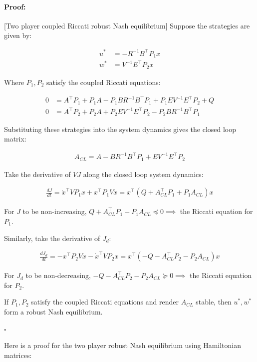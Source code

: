 \documentclass[3p]{elsarticle}
\newenvironment{proof}{\paragraph{Proof:}}{\hfill$\square$}
\begin{document}
\begin{proof}[Two player coupled Riccati robust Nash equilibrium]
Suppose the strategies are given by: 

\begin{align}
u^* &= -R^{-1}B^\top P_1 x \\
w^* &= V^{-1}E^\top P_2 x
\end{align}

Where $P_1, P_2$ satisfy the coupled Riccati equations:

\begin{align}
0 &= A^\top P_1 + P_1 A - P_1 BR^{-1} B^\top P_1 + P_1 E V^{-1}E^\top P_2 + Q\\
0 &= A^\top P_2 + P_2 A + P_2 E V^{-1}E^\top P_2 - P_2 BR^{-1}B^\top P_1
\end{align}

Substituting these strategies into the system dynamics gives the closed loop matrix:

\begin{align} 
A_{CL} = A - BR^{-1}B^\top P_1 + EV^{-1}E^\top P_2
\end{align}

Take the derivative of $VJ$ along the closed loop system dynamics:

\begin{align}
\frac{dJ}{dt} = \dot{x}^\top VP_1 x + x^\top P_1V\dot{x} = x^\top (Q + A_{CL}^\top P_1 + P_1 A_{CL}) x
\end{align}

For $J$ to be non-increasing, $Q + A_{CL}^\top P_1 + P_1 A_{CL} \preceq 0 \implies$ the Riccati equation for $P_1$.

Similarly, take the derivative of $J_d$: 

\begin{align}
\frac{dJ_d}{dt} = -x^\top P_2 V \dot{x} - \dot{x}^\top V P_2 x = x^\top (-Q - A_{CL}^\top P_2 - P_2 A_{CL}) x
\end{align}

For $J_d$ to be non-decreasing, $-Q - A_{CL}^\top P_2 - P_2 A_{CL} \succeq 0 \implies$ the Riccati equation for $P_2$.

If $P_1, P_2$ satisfy the coupled Riccati equations and render $A_{CL}$ stable, then $u^*, w^*$ form a robust Nash equilibrium.

\end{proof}

Here is a proof for the two player robust Nash equilibrium using Hamiltonian matrices:
\end{document}
